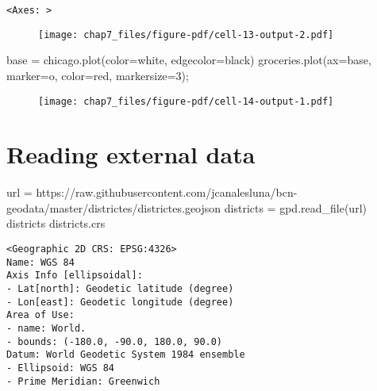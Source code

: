 \documentclass[
  letterpaper,
  DIV=11,
  numbers=noendperiod]{scrreprt}
\newenvironment{Shaded}{\begin{snugshade}}{\end{snugshade}}
\newcommand{\DecValTok}[1]{\textcolor[rgb]{0.68,0.00,0.00}{#1}}
\newcommand{\NormalTok}[1]{\textcolor[rgb]{0.00,0.23,0.31}{#1}}
\newcommand{\OperatorTok}[1]{\textcolor[rgb]{0.37,0.37,0.37}{#1}}
\newcommand{\StringTok}[1]{\textcolor[rgb]{0.13,0.47,0.30}{#1}}
\begin{document}
\begin{verbatim}
<Axes: >
\end{verbatim}

\begin{figure}[H]

{\centering \texttt{[image: chap7\_files/figure-pdf/cell-13-output-2.pdf]}

}

\end{figure}

\begin{Shaded}
\begin{Highlighting}[]
\NormalTok{base }\OperatorTok{=}\NormalTok{ chicago.plot(color}\OperatorTok{=}\StringTok{\textquotesingle{}white\textquotesingle{}}\NormalTok{, edgecolor}\OperatorTok{=}\StringTok{\textquotesingle{}black\textquotesingle{}}\NormalTok{)}
\NormalTok{groceries.plot(ax}\OperatorTok{=}\NormalTok{base, marker}\OperatorTok{=}\StringTok{\textquotesingle{}o\textquotesingle{}}\NormalTok{, color}\OperatorTok{=}\StringTok{\textquotesingle{}red\textquotesingle{}}\NormalTok{, markersize}\OperatorTok{=}\DecValTok{3}\NormalTok{)}\OperatorTok{;}
\end{Highlighting}
\end{Shaded}

\begin{figure}[H]

{\centering \texttt{[image: chap7\_files/figure-pdf/cell-14-output-1.pdf]}

}

\end{figure}

\hypertarget{reading-external-data}{%
\section{Reading external data}\label{reading-external-data}}

\begin{Shaded}
\begin{Highlighting}[]
\NormalTok{url }\OperatorTok{=} \StringTok{\textquotesingle{}https://raw.githubusercontent.com/jcanalesluna/bcn{-}geodata/master/districtes/districtes.geojson\textquotesingle{}}
\NormalTok{districts }\OperatorTok{=}\NormalTok{ gpd.read\_file(url)}
\NormalTok{districts}
\NormalTok{districts.crs}
\end{Highlighting}
\end{Shaded}

\begin{verbatim}
<Geographic 2D CRS: EPSG:4326>
Name: WGS 84
Axis Info [ellipsoidal]:
- Lat[north]: Geodetic latitude (degree)
- Lon[east]: Geodetic longitude (degree)
Area of Use:
- name: World.
- bounds: (-180.0, -90.0, 180.0, 90.0)
Datum: World Geodetic System 1984 ensemble
- Ellipsoid: WGS 84
- Prime Meridian: Greenwich
\end{verbatim}
\end{document}
